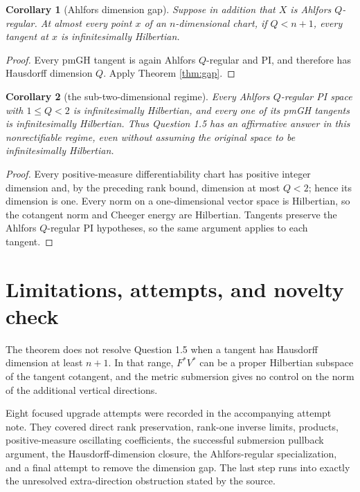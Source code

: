 \documentclass[11pt]{article}
\newtheorem{corollary}{Corollary}
\begin{document}
\begin{corollary}[Ahlfors dimension gap]\label{cor:ahlfors}
Suppose in addition that \(X\) is Ahlfors \(Q\)-regular. At almost every
point \(x\) of an \(n\)-dimensional chart, if \(Q<n+1\), every tangent at \(x\)
is infinitesimally Hilbertian.
\end{corollary}

\begin{proof}
Every pmGH tangent is again Ahlfors \(Q\)-regular and PI, and therefore has
Hausdorff dimension \(Q\). Apply Theorem \ref{thm:gap}.
\end{proof}

\begin{corollary}[the sub-two-dimensional regime]
Every Ahlfors \(Q\)-regular PI space with \(1\leq Q<2\) is infinitesimally
Hilbertian, and every one of its pmGH tangents is infinitesimally Hilbertian.
Thus Question 1.5 has an affirmative answer in this nonrectifiable regime,
even without assuming the original space to be infinitesimally Hilbertian.
\end{corollary}

\begin{proof}
Every positive-measure differentiability chart has positive integer dimension
and, by the preceding rank bound, dimension at most \(Q<2\); hence its
dimension is one. Every norm on a one-dimensional vector space is Hilbertian,
so the cotangent norm and Cheeger energy are Hilbertian. Tangents preserve
the Ahlfors \(Q\)-regular PI hypotheses, so the same argument applies to each
tangent.
\end{proof}

\section*{Limitations, attempts, and novelty check}

The theorem does not resolve Question 1.5 when a tangent has Hausdorff
dimension at least \(n+1\). In that range, \(F^*V^*\) can be a proper
Hilbertian subspace of the tangent cotangent, and the metric submersion gives
no control on the norm of the additional vertical directions.

Eight focused upgrade attempts were recorded in the accompanying attempt
note. They covered direct rank preservation, rank-one inverse limits,
products, positive-measure oscillating coefficients, the successful
submersion pullback argument, the Hausdorff-dimension closure, the
Ahlfors-regular specialization, and a final attempt to remove the dimension
gap. The last step runs into exactly the unresolved extra-direction
obstruction stated by the source.
\end{document}
